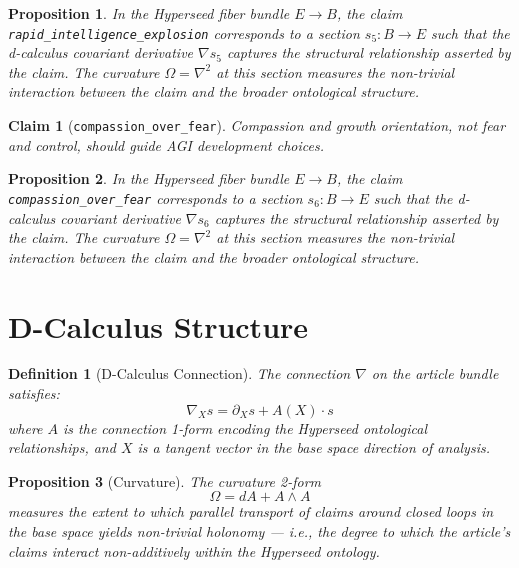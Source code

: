 \documentclass{article}
\newtheorem{claim}{Claim}
\newtheorem{definition}{Definition}
\newtheorem{proposition}{Proposition}
\begin{document}
\begin{proposition}
In the Hyperseed fiber bundle $E \to B$, the claim \texttt{rapid_intelligence_explosion} corresponds to a section $s_5: B \to E$ such that the d-calculus covariant derivative $\nabla s_5$ captures the structural relationship asserted by the claim. The curvature $\Omega = \nabla^2$ at this section measures the non-trivial interaction between the claim and the broader ontological structure.
\end{proposition}

\begin{claim}[\texttt{compassion_over_fear}]
Compassion and growth orientation, not fear and control, should guide AGI development choices.
\end{claim}

\begin{proposition}
In the Hyperseed fiber bundle $E \to B$, the claim \texttt{compassion_over_fear} corresponds to a section $s_6: B \to E$ such that the d-calculus covariant derivative $\nabla s_6$ captures the structural relationship asserted by the claim. The curvature $\Omega = \nabla^2$ at this section measures the non-trivial interaction between the claim and the broader ontological structure.
\end{proposition}

\section{D-Calculus Structure}

\begin{definition}[D-Calculus Connection]
The connection $\nabla$ on the article bundle satisfies:
\begin{equation}
  \nabla_X s = \partial_X s + A(X) \cdot s
\end{equation}
where $A$ is the connection 1-form encoding the Hyperseed ontological relationships, and $X$ is a tangent vector in the base space direction of analysis.
\end{definition}

\begin{proposition}[Curvature]
The curvature 2-form
\begin{equation}
  \Omega = dA + A \wedge A
\end{equation}
measures the extent to which parallel transport of claims around closed loops in the base space yields non-trivial holonomy --- i.e., the degree to which the article's claims interact non-additively within the Hyperseed ontology.
\end{proposition}
\end{document}

